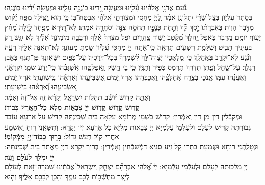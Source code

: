 \documentclass[twoside, openany, parskip=half, 11pt]{book}
\begin{document}
\halfkaddish


\label{vihi noam} 
 \\
 נֹ֨עַם אֲדֹנָ֥י אֱלֹהֵ֗ינוּ עָ֫לֵ֥ינוּ וּמַֽעֲשֵׂ֣ה יָ֭דֵינוּ כּֽוֹנֲנָ֣ה עָלֵ֑ינוּ וּמַֽעֲשֵׂ֥ה יָ֝דֵ֗ינוּ כּֽוֹנֲנֵֽהוּ׃\\
 בְּסֵ֣תֶר עֶלְי֑וֹן בְּצֵ֥ל שַׁ֝דַּ֗י יִתְלוֹנָֽן׃
אֹמַ֗ר לַ֭יְיָ מַחְסִ֣י וּמְצֽוּדָתִ֑י אֱ֝לֹהַ֗י אֶבְטַח־בּֽוֹ׃ 
כִּ֤י ה֣וּא יַ֭צִּֽילְֿךָ מִפַּ֥ח יָ֝ק֗וּשׁ מִדֶּ֥בֶר הַוּֽוֹת׃ 
בְּאֶבְרָת֨וֹ יָ֣סֶךְ לָ֗ךְ וְתַ֣חַת כְּנָפָ֣יו תֶּחְסֶ֑ה צִנָּ֖ה וְסֹֽחֵרָ֣ה אֲמִתּֽוֹ׃ 
לֹֽא־תִ֭ירָא מִפַּ֣חַד לָ֑יְלָה מֵ֝חֵ֗ץ יָע֥וּף יוֹמָֽם׃ 
מִ֭דֶּֽבֶר בָּאֹ֣פֶל יַֽהֲלֹ֑ךְ מִ֝קֶּ֗טֶב יָשׁ֥וּד צָֽהֳרָֽיִם׃ 
יִפֹּ֤ל מִצִּדְּֿךָ֙ אֶ֗לֶף וּרְבָבָ֥ה מִֽימִינֶ֑ךָ אֵ֝לֶ֗יךָ לֹ֣א יִגָּֽשׁ׃ 
רַ֭ק בְּעֵינֶ֣יךָ תַבִּ֑יט וְשִׁלֻּמַ֖ת רְשָׁעִ֣ים תִּרְאֶֽה׃ 
כִּֽי־אַתָּ֣ה יְיָ֣ מַחְסִּ֑י עֶ֝לְי֗וֹן שַׂ֣מְתָּ מְעוֹנֶֽךָ׃ 
לֹֽא־תְאֻנֶּ֣ה אֵלֶ֣יךָ רָעָ֑ה וְנֶ֗֝גַע לֹֽא־יִקְרַ֥ב בְּאָֽהֳלֶֽךָ׃ 
כִּ֣י מַ֭לְאָכָיו יְצַוֶּה־לָּ֑ךְ לִ֝שְׁמָרְךָ֗ בְּכָל־דְּרָכֶֽיךָ׃ 
עַל־כַּפַּ֥יִם יִשָּׂא֑וּנְךָ פֶּן־תִּגֹּ֖ף בָּאֶ֣בֶן רַגְלֶֽךָ׃ 
עַל־שַׁ֣חַל וָפֶ֣תֶן תִּדְרֹ֑ךְ תִּרְמֹ֖ס כְּפִ֣יר וְתַנִּֽין׃ 
כִּ֤י בִ֣י חָ֭שַׁק וַֽאֲפַלְּֿטֵ֑הוּ אֲשַׂ֝גְּֿבֵ֗הוּ כִּֽי־יָדַ֥ע שְׁמִֽי׃ 
יִקְרָאֵ֨נִי וְֽאֶֽעֱנֵ֗הוּ עִמּ֣וֹ אָֽנֹכִ֣י בְצָרָ֑ה אֲ֝חַלְּֿצֵֽ֗הוּ וַֽאֲכַבְּֿדֵֽהוּ׃ 
אֹ֣רֶךְ יָ֭מִים ֖אַשְׂבִּיעֵ֑הוּ וְ֝אַרְאֵ֗הוּ בִּֽישֽׁוּעָתִֽי׃
אֹ֣רֶךְ יָ֭מִים ֖אַשְׂבִּיעֵ֑הוּ וְ֝אַרְאֵ֗הוּ בִּֽישֽׁוּעָתִֽי׃\\
 \label{v ata kadosh}
 וְאַתָּ֥ה
%
 קָד֑וֹשׁ י֝וֹשֵׁ֗ב תְּהִלּ֥וֹת יִשְׂרָאֵֽל׃
%
  וְקָרָ֨א זֶ֤ה אֶל־זֶה֙ וְאָמַ֔ר׃\\
\textbf{קָד֧וֹשׁ קָד֛וֹשׁ קָד֖וֹשׁ יְיָ֣ צְבָא֑וֹת מְלֹ֥א כָל־הָאָ֖רֶץ כְּבוֹדֽוֹ׃}\\
 וּמְקַבְּֿלִין דֵּין מִן דֵּין וְאָמְֿרִין: קַדִּישׁ בִּשְׁמֵי מְרוֹמָא עִלָּאָה בֵּית שְׁכִינְתֵּהּ קַדִּישׁ עַל אַרְעָא עוֹבַד גְּבוּרְתֵּהּ קַדִּישׁ לְעָלַם וּלְעָלְֿמֵי עָלְֿמַיָּא יְיָ צְבָאוֹת מַלְיָא כָל אַרְעָא זִיו יְקָרֵהּ:  וַתִּשָּׂאֵֽנִי רֽוּחַ וָאֶשְׁמַע אַחֲרַי קוֹל רַֽעַשׁ גָּדוֹל:
\textbf{בָּר֥וּךְ כְּבוֹד־יְיָ֖ מִמְּֿקוֹמֽוֹ׃} \\
וּנְטָלַֽתְנִי רוּחָא וּשְׁמָעֵת בַּתְרַי קָל זִֽיעַ סַגִּיא דִּמְֿשַׁבְּֿחִין וְאָמְֿרִין: בְּרִיךְ יְקָרָא דַיְיָ מֵאֲתַר בֵּית שְׁכִינְתֵּהּ: 
\textbf{יְיָ֥ יִמְלֹ֖ךְ לְעֹלָ֥ם וָעֶֽד׃} \\
 יְיָ מַלְכוּתֵהּ לְעָלַם וּלְעַלְֿמֵי עָלְֿמְיָּא: יְיָ֗
%
 אֱ֠לֹהֵי אַבְרָהָ֞ם יִצְחָ֤ק וְיִשְׂרָאֵל֙ אֲבֹתֵ֔ינוּ שָׁמְרָה־זֹּ֣את לְעוֹלָ֔ם לְיֵ֥צֶר מַחְשְֿׁב֖וֹת לְבַ֣ב עַמֶּ֑ךָ וְהָכֵ֥ן לְבָבָ֖ם אֵלֶֽיךָ׃ וְה֤וּא
\end{document}
